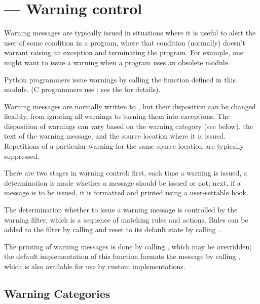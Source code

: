 \section{ ---
         Warning control}



Warning messages are typically issued in situations where it is useful
to alert the user of some condition in a program, where that condition
(normally) doesn't warrant raising an exception and terminating the
program.  For example, one might want to issue a warning when a
program uses an obsolete module.

Python programmers issue warnings by calling the 
function defined in this module.  (C programmers use
; see the
 for details).

Warning messages are normally written to , but their
disposition can be changed flexibly, from ignoring all warnings to
turning them into exceptions.  The disposition of warnings can vary
based on the warning category (see below), the text of the warning
message, and the source location where it is issued.  Repetitions of a
particular warning for the same source location are typically
suppressed.

There are two stages in warning control: first, each time a warning is
issued, a determination is made whether a message should be issued or
not; next, if a message is to be issued, it is formatted and printed
using a user-settable hook.

The determination whether to issue a warning message is controlled by
the warning filter, which is a sequence of matching rules and actions.
Rules can be added to the filter by calling
 and reset to its default state by calling
.

The printing of warning messages is done by calling
, which may be overridden; the default
implementation of this function formats the message by calling
, which is also available for use by custom
implementations.


\subsection{Warning Categories \label{warning-categories}}

